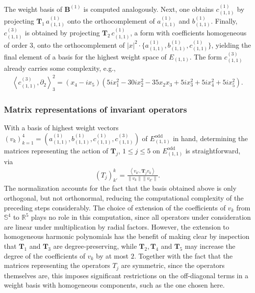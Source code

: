 \documentclass[11pt,reqno]{amsart}
\theoremstyle{remark}
\theoremstyle{definition}
\begin{document}
The weight basis of $\mathbf B^{(1)}$ is computed analogously. Next, one obtains $c^{(1)}_{(1,1)}$ by projecting $\mathbf T_1 \, a^{(1)}_{(1,1)}$ onto the orthocomplement of $a^{(1)}_{(1,1)}$ and $b^{(1)}_{(1,1)}$. Finally, $c^{(3)}_{(1,1)}$ is obtained by projecting $\mathbf T_2 \, c^{(1)}_{(1,1)}$, a form with coefficients homogeneous of order $3$, onto the orthocomplement of $|x|^2 \cdot \{a^{(1)}_{(1,1)}, b^{(1)}_{(1,1)}, c^{(1)}_{(1,1)}\}$, yielding the final element of a basis for the highest weight space of $E_{(1,1)}$. The form $c^{(3)}_{(1,1)}$ already carries some complexity, e.g., 
\begin{align*}
    \left\langle c^{(3)}_{(1,1)}, \partial_{2} \right\rangle^2_3 = (x_4 - i x_5) (5 i x_{1}^{2} - 30 i x_{2}^{2} - 35 x_{2} x_{3} + 5 i x_{3}^{2} + 5 i x_{4}^{2} + 5 i x_{5}^{2}).
\end{align*}

\subsubsection{Matrix representations of invariant operators}

With a basis of highest weight vectors $(v_k)_{k=1}^4 = \left(a^{(1)}_{(1,1)}, b^{(1)}_{(1,1)}, c^{(1)}_{(1,1)}, c^{(3)}_{(1,1)}\right)$ of $E_{(1,1)}^{\mathrm{odd}}$ in hand, determining the matrices representing the action of $\mathbf T_j$, $1 \leq j \leq 5$ on $E_{(1,1)}^{\mathrm{odd}}$ is straightforward, via
\begin{align*}
    (T_j)^{k}_{k'} = \frac{ \left\langle v_{k'}, \mathbf T_j v_k\right\rangle}{ \|v_k\| \|v_{k'}\|}.
\end{align*}
The normalization accounts for the fact that the basis obtained above is only orthogonal, but not orthonormal, reducing the computational complexity of the preceding steps considerably. The choice of extension of the coefficients of $v_k$ from $\mathbb S^4$ to $\mathbb R^5$ plays no role in this computation, since all operators under consideration are linear under multiplication by radial factors. However, the extension to homogeneous harmonic polynomials has the benefit of making clear by inspection that $\mathbf T_1$ and $\mathbf T_3$ are degree-preserving, while $\mathbf T_2,\mathbf T_4$ and $\mathbf T_5$ may increase the degree of the coefficients of $v_k$ by at most $2$. Together with the fact that the matrices representing the operators $T_j$ are symmetric, since the operators themselves are, this imposes significant restrictions on the off-diagonal terms in a weight basis with homogeneous components, such as the one chosen here.
\end{document}
